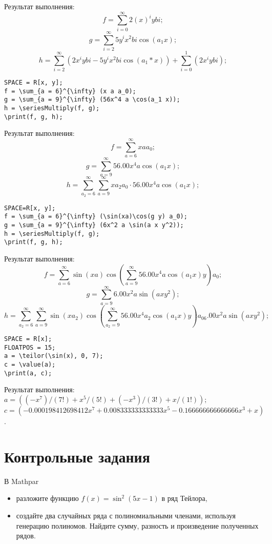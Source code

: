 Результат выполнения:\\
$$f = \sum_{i=0}^{\infty} 2(x)^iybi;$$
$$g = \sum_{i=2}^{\infty} 5y^ix^2bi\cos(a_1x);$$
$$h = \sum_{i=2}^{\infty} (2x^iybi-5y^ix^2bi\cos(a_1*x))+\sum_{i=0}^{1}(2x^iybi);$$

\begin{verbatim}
SPACE = R[x, y];
f = \sum_{a = 6}^{\infty} (x a a_0);
g = \sum_{a = 9}^{\infty} (56x^4 a \cos(a_1 x));
h = \seriesMultiply(f, g); 
\print(f, g, h);
\end{verbatim} 

Результат выполнения:\\
$$f = \sum_{a=6}^{\infty} xaa_0;$$
$$g = \sum_{a=9}^{\infty} 56. 00x^4a\cos(a_1x);$$
$$h = \sum_{a_2=6}^{\infty} \sum_{a=9}^{\infty} xa_2a_0\cdot 56. 00x^4a\cos(a_1x);$$

\begin{verbatim}
SPACE=R[x, y];
f = \sum_{a = 6}^{\infty} (\sin(xa)\cos(g y) a_0);
g = \sum_{a = 9}^{\infty} (6x^2 a \sin(a x y^2));
h = \seriesMultiply(f, g); 
\print(f, g, h);
\end{verbatim}

Результат выполнения:\\
$$f = \sum_{a=6}^{\infty} \sin(xa)\cos(\sum_{a=9}^{\infty} 56. 00x^4a\cos(a_1x)y)a_0;$$
$$g = \sum_{a=9}^{\infty} 6. 00x^2a\sin(axy^2);$$
$$h = \sum_{a_2=6}^{\infty} \sum_{a=9}^{\infty} \sin(xa_2)\cos(\sum_{a_2=9}^{\infty} 56. 00x^4a_2\cos(a_1x)y)a_06. 00x^2a\sin(axy^2);$$

\begin{verbatim}
SPACE = R[x]; 
FLOATPOS = 15;
a = \teilor(\sin(x), 0, 7);
c = \value(a); 
\print(a, c);
\end{verbatim} 
Результат выполнения:\\
$a = ((-x^{7})/(7\mathbf{}!)+x^{5}/(5\mathbf{}!)+(-x^{3})/(3\mathbf{}!)+x/(1\mathbf{}!)); $\\
$c = (-0. 000198412698412x^{7}+0. 008333333333333x^{5}-0. 166666666666666x^{3}+x)$.  

\section{Контрольные задания}
В  Mathpar 
\begin{itemize}
 \item разложите функцию $f(x) = \sin^2(5x - 1)$ в ряд Тейлора, 
 \item создайте два случайных ряда с полиномиальными членами,  используя генерацию полиномов.  Найдите сумму,  разность и произведение полученных рядов. 
  \end{itemize}
